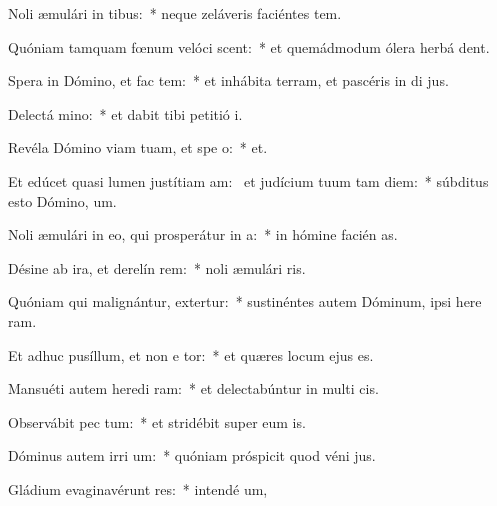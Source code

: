 \item Noli æmulári in tibus:~* neque zeláveris faciéntes tem.
\item Quóniam tamquam fœnum velóci scent:~* et quemádmodum ólera herbá  dent.
\item Spera in Dómino, et fac tem:~* et inhábita terram, et pascéris in di jus.
\item Delectá  mino:~* et dabit tibi petitió  i.
\item Revéla Dómino viam tuam, et spe  o:~*   et.
\item Et edúcet quasi lumen justítiam am:~\pscross{} et judícium tuum tam diem:~* súbditus esto Dómino,   um.
\item Noli æmulári in eo, qui prosperátur in  a:~* in hómine facién as.
\item Désine ab ira, et derelín rem:~* noli æmulári  ris.
\item Quóniam qui malignántur, extertur:~* sustinéntes autem Dóminum, ipsi here ram.
\item Et adhuc pusíllum, et non e tor:~* et quæres locum ejus   es.
\item Mansuéti autem heredi ram:~* et delectabúntur in multi cis.
\item Observábit pec tum:~* et stridébit super eum  is.
\item Dóminus autem irri um:~* quóniam próspicit quod véni  jus.
\item Gládium evaginavérunt res:~* intendé  um,
